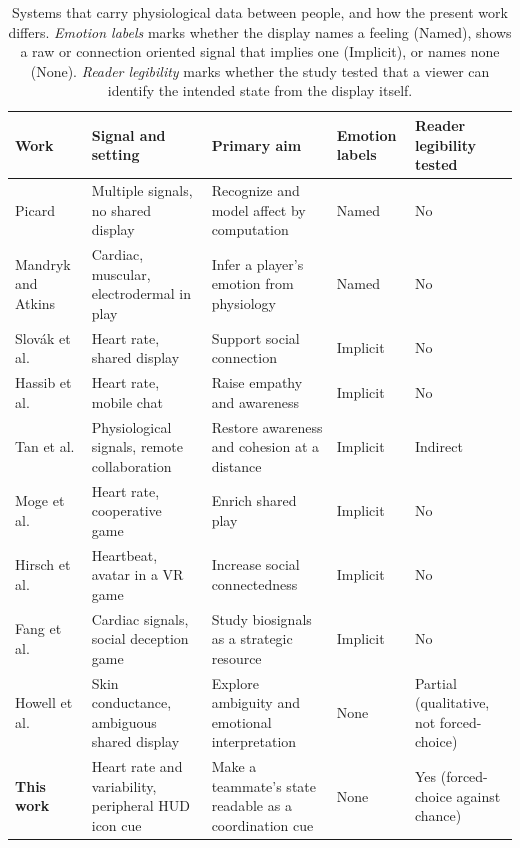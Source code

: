 \documentclass[manuscript,review,anonymous]{acmart}
\begin{document}
\begin{table}[t]
\scriptsize
\setlength{\tabcolsep}{4pt}
\renewcommand{\arraystretch}{0.92}
\caption{Systems that carry physiological data between people, and how the present work differs. \emph{Emotion labels} marks whether the display names a feeling (Named), shows a raw or connection oriented signal that implies one (Implicit), or names none (None). \emph{Reader legibility} marks whether the study tested that a viewer can identify the intended state from the display itself.}
\label{tab:related}
\begin{tabular}{@{}l p{2.1cm} p{2.8cm} p{1.1cm} p{1.5cm}@{}}
\toprule
Work & Signal and setting & Primary aim & Emotion labels & Reader legibility tested \\
\midrule
Picard \cite{picard_affective_1997} & Multiple signals, no shared display & Recognize and model affect by computation & Named & No \\
Mandryk and Atkins \cite{mandryk_fuzzy_2007} & Cardiac, muscular, electrodermal in play & Infer a player's emotion from physiology & Named & No \\
Slov\'ak et al. \cite{slovak_understanding_2012} & Heart rate, shared display & Support social connection & Implicit & No \\
Hassib et al. \cite{hassib_heartchat_2017} & Heart rate, mobile chat & Raise empathy and awareness & Implicit & No \\
Tan et al. \cite{tan_role_2014} & Physiological signals, remote collaboration & Restore awareness and cohesion at a distance & Implicit & Indirect \\
Moge et al. \cite{moge_shared_2022} & Heart rate, cooperative game & Enrich shared play & Implicit & No \\
Hirsch et al. \cite{hirsch_my_2023} & Heartbeat, avatar in a VR game & Increase social connectedness & Implicit & No \\
Fang et al. \cite{fang_cardiac_2022} & Cardiac signals, social deception game & Study biosignals as a strategic resource & Implicit & No \\
Howell et al. \cite{howell_biosignals_2016} & Skin conductance, ambiguous shared display & Explore ambiguity and emotional interpretation & None & Partial (qualitative, not forced-choice) \\
\textbf{This work} & Heart rate and variability, peripheral HUD icon cue & Make a teammate's state readable as a coordination cue & None & Yes (forced-choice against chance) \\
\bottomrule
\end{tabular}
\end{table}
\end{document}
